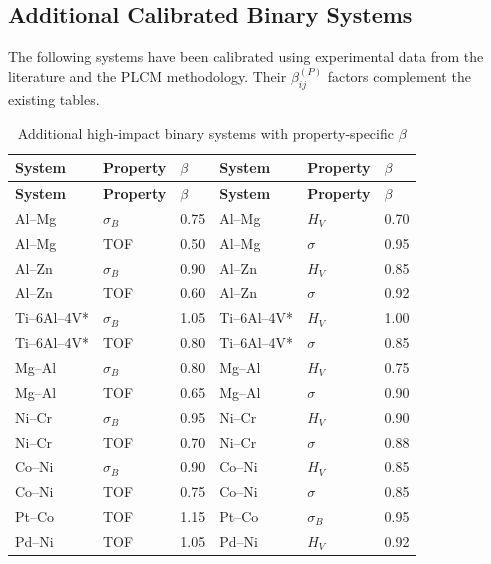 \documentclass[12pt,a4paper]{article}
\begin{document}
	\subsection*{Additional Calibrated Binary Systems}
	
	The following systems have been calibrated using experimental data from the literature and the PLCM methodology. Their $\beta_{ij}^{(P)}$ factors complement the existing tables.
	
	\begin{longtable}{p{2.2cm} p{2.2cm} p{1.2cm} p{2.2cm} p{2.2cm} p{1.2cm}}
		\caption{Additional high‑impact binary systems with property‑specific $\beta$}\label{tab:beta_additional}\\
		\toprule
		\textbf{System} & \textbf{Property} & $\beta$ & \textbf{System} & \textbf{Property} & $\beta$ \\
		\midrule
		\endfirsthead
		\toprule
		\textbf{System} & \textbf{Property} & $\beta$ & \textbf{System} & \textbf{Property} & $\beta$ \\
		\midrule
		\endhead
		Al–Mg & $\sigma_B$ & 0.75 & Al–Mg & $H_V$ & 0.70 \\
		Al–Mg & TOF & 0.50 & Al–Mg & $\sigma$ & 0.95 \\
		Al–Zn & $\sigma_B$ & 0.90 & Al–Zn & $H_V$ & 0.85 \\
		Al–Zn & TOF & 0.60 & Al–Zn & $\sigma$ & 0.92 \\
		Ti–6Al–4V* & $\sigma_B$ & 1.05 & Ti–6Al–4V* & $H_V$ & 1.00 \\
		Ti–6Al–4V* & TOF & 0.80 & Ti–6Al–4V* & $\sigma$ & 0.85 \\
		Mg–Al & $\sigma_B$ & 0.80 & Mg–Al & $H_V$ & 0.75 \\
		Mg–Al & TOF & 0.65 & Mg–Al & $\sigma$ & 0.90 \\
		Ni–Cr & $\sigma_B$ & 0.95 & Ni–Cr & $H_V$ & 0.90 \\
		Ni–Cr & TOF & 0.70 & Ni–Cr & $\sigma$ & 0.88 \\
		Co–Ni & $\sigma_B$ & 0.90 & Co–Ni & $H_V$ & 0.85 \\
		Co–Ni & TOF & 0.75 & Co–Ni & $\sigma$ & 0.85 \\
		Pt–Co & TOF & 1.15 & Pt–Co & $\sigma_B$ & 0.95 \\
		Pd–Ni & TOF & 1.05 & Pd–Ni & $H_V$ & 0.92 \\
		\bottomrule
	\end{longtable}
	\vspace{0.2cm}
	
\end{document}
